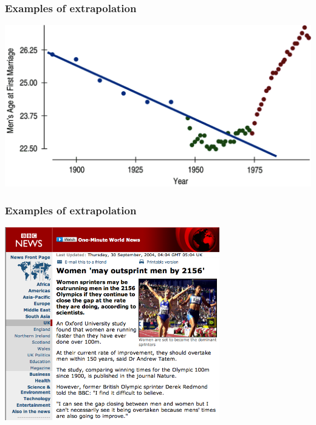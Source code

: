 
\begin{frame}
\frametitle{Examples of extrapolation}

\begin{center}
\includegraphics[width=\textwidth]{8-2_least_square_reg/figures/extrapolation}
\end{center}

\end{frame}


\begin{frame}
\frametitle{Examples of extrapolation}

\begin{center}
\includegraphics[width=0.7\textwidth]{8-2_least_square_reg/figures/womenOutsprintBBC}
\end{center}

\end{frame}


